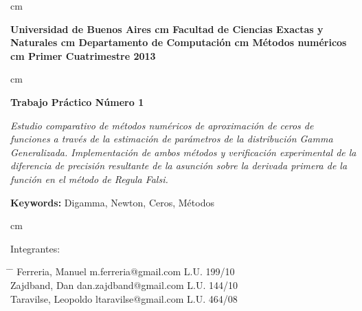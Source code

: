  cm
\begin{flushright}
\huge\bf Universidad de Buenos Aires
 cm
\Large\bf Facultad de Ciencias Exactas y Naturales
 cm
\Large\bf Departamento de Computaci\'on
 cm
\Large\bf  M\'etodos num\'ericos
 cm
\Large\bf Primer Cuatrimestre 2013
\end{flushright}

 cm
\begin{center}
\LARGE\bf Trabajo Pr\'actico N\'umero 1

\vskip 1.0cm
\normalsize \emph{Estudio comparativo de m\'etodos num\'ericos de aproximaci\'on de ceros de funciones a trav\'es de la estimaci\'on de par\'ametros de la distribuci\'on Gamma Generalizada. Implementaci\'on de ambos m\'etodos y verificaci\'on experimental de la diferencia de precisi\'on resultante de la asunci\'on sobre la derivada primera de la funci\'on en el m\'etodo de Regula Falsi.}

\vskip 1.0cm
\large {\bf Keywords:} Digamma, Newton, Ceros, M\'etodos

\end{center}



 cm
\begin{flushleft}
\large Integrantes:
\begin{tabbing}
\hspace{5cm} \= \hspace{5.5cm} \= \hspace{3cm} \kill
Ferreria, Manuel \> m.ferreria@gmail.com \> L.U. 199/10  \\
Zajdband, Dan \> dan.zajdband@gmail.com \> L.U. 144/10 \\
Taravilse, Leopoldo \> ltaravilse@gmail.com \> L.U. 464/08\\
\end{tabbing}
\end{flushleft}
